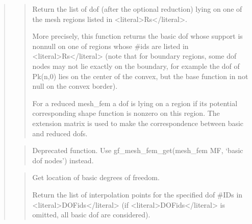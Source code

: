 \documentclass[a4paper,11pt,english]{sphinxmanual}
\begin{document}
\begin{quote}
\sphinxAtStartPar
{}
\begin{quote}

\sphinxAtStartPar
Return the list of dof (after the optional reduction) lying on one
of the mesh regions listed in \textless{}literal\textgreater{}Rs\textless{}/literal\textgreater{}.

\sphinxAtStartPar
More precisely, this function returns the basic dof whose support is
non\sphinxhyphen{}null on one of regions whose \#ids are listed in \textless{}literal\textgreater{}Rs\textless{}/literal\textgreater{} (note
that for boundary regions, some dof nodes may not lie exactly
on the boundary, for example the dof of Pk(n,0) lies on the center
of the convex, but the base function in not null on the convex
border).

\sphinxAtStartPar
For a reduced mesh\_fem
a dof is lying on a region if its potential corresponding shape
function is nonzero on this region. The extension matrix is used
to make the correspondence between basic and reduced dofs.
\end{quote}

\sphinxAtStartPar
{}
\begin{quote}

\sphinxAtStartPar
Deprecated function. Use gf\_mesh\_fem\_get(mesh\_fem MF, ‘basic dof nodes’) instead.
\end{quote}

\sphinxAtStartPar
{}
\begin{quote}

\sphinxAtStartPar
Get location of basic degrees of freedom.

\sphinxAtStartPar
Return the list of interpolation points for the specified
dof \#IDs in \textless{}literal\textgreater{}DOFids\textless{}/literal\textgreater{} (if \textless{}literal\textgreater{}DOFids\textless{}/literal\textgreater{} is omitted, all basic dof are
considered).
\end{quote}

\sphinxAtStartPar
{}
\begin{quote}


\end{quote}
\end{quote}
\end{document}
